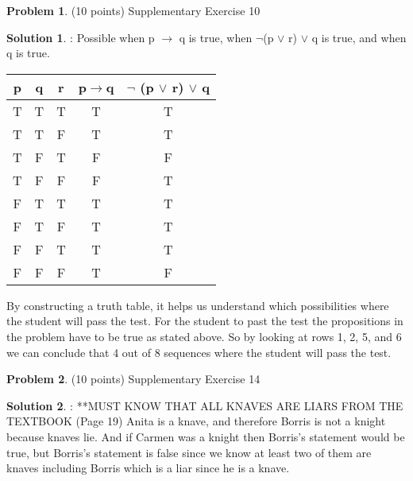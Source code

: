 \documentclass{article}
\theoremstyle{definition}
\newtheorem{problem}{Problem}
\newtheorem*{solution}{Solution}
\begin{document}
\begin{problem} (10 points) 
Supplementary Exercise 10
\end{problem}
\begin{solution}:
\newline
Possible when p $\to$ q is true, when $\neg$(p $\vee$ r) $\vee$ q is true, and when q is true. 
\bigskip

\begin{center}
\begin{tabular}{ | c | c | c | c | c |} 
 \hline
 p & q & r & p$\to$q & $\neg$ (p $\vee$ r) $\vee$ q \\
 \hline 
 T & T & T & T & T \\ 
 T & T & F & T & T \\ 
 T & F & T & F & F \\ 
 T & F & F & F & T \\ 
 F & T & T & T & T \\   
 F & T & F & T & T \\ 
 F & F & T & T & T \\ 
 F & F & F & T & F \\ 
 \hline
\end{tabular}
\end{center}

By constructing a truth table, it helps us understand which possibilities where the student will pass the test. For the student to past the test the propositions in the problem have to be true as stated above. So by looking at rows 1, 2, 5, and 6 we can conclude that 4 out of 8 sequences where the student will pass the test.
\end{solution}

\newpage

\begin{problem} (10 points) 
Supplementary Exercise 14
\end{problem}
\begin{solution}:
\newline
**MUST KNOW THAT ALL KNAVES ARE LIARS FROM THE TEXTBOOK (Page 19)
\newline
Anita is a knave, and therefore Borris is not a knight because knaves lie. And if Carmen was a knight then Borris's statement would be true, but Borris's statement is false since we know at least two of them are knaves including Borris which is a liar since he is a knave.
\end{solution}

\newpage
\end{document}
